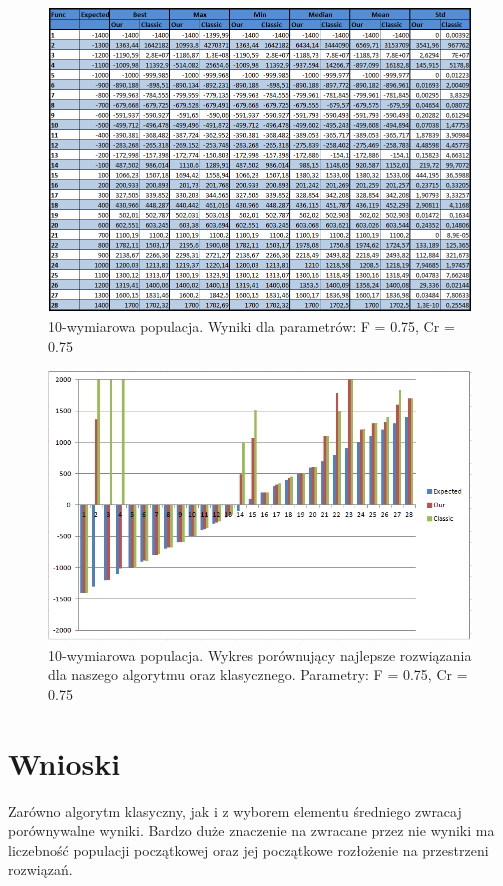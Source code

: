 \documentclass[a4paper]{article}
\begin{document}
\begin{figure}
\centering
\includegraphics[width=\textwidth]{F75Cr75L10tab.png}
\caption{10-wymiarowa populacja. Wyniki dla parametrów: F = 0.75, Cr = 0.75}
\end{figure}

\begin{figure}
\centering
\includegraphics[width=\textwidth]{F75Cr75L10chart.png}
\caption{10-wymiarowa populacja. Wykres porównujący najlepsze rozwiązania dla naszego algorytmu oraz klasycznego. Parametry: F = 0.75, Cr = 0.75}
\end{figure}

\newpage
\newpage
\section{Wnioski}
Zarówno algorytm klasyczny, jak i z wyborem elementu średniego zwracaj porównywalne wyniki. Bardzo duże znaczenie na zwracane przez nie wyniki ma liczebność populacji początkowej oraz jej początkowe rozłożenie na przestrzeni rozwiązań. 
\end{document}
